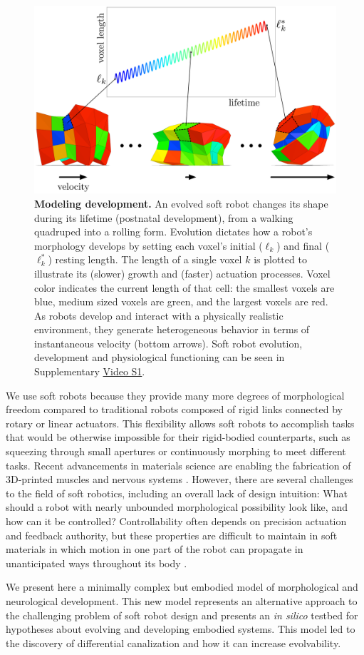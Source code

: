 \begin{figure}[t]
\centering
\includegraphics[width=0.8\linewidth]{Chapter04/Fig1}
\caption{\label{fig:blueprint}\textbf{Modeling development.} An evolved soft robot changes its shape during its lifetime (postnatal development), from a walking quadruped into a rolling form. 
Evolution dictates how a robot's morphology develops by setting each voxel's initial ($\ell_k$) and final ($\ell^*_k$) resting length.
The length of a single voxel $k$ is plotted to illustrate its (slower) growth and (faster) actuation processes.
Voxel color indicates the current length of that cell: the smallest voxels are blue, medium sized voxels are green, and the largest voxels are red.
As robots develop and interact with a physically realistic environment, they generate heterogeneous behavior in terms of instantaneous velocity (bottom arrows).
Soft robot evolution, development and physiological functioning can be seen in Supplementary \href{https://youtu.be/Ee2sU-AZWC4}{\color{blue}Video S1}.
}
\end{figure}


We use soft robots because they provide many more degrees of morphological freedom compared to traditional robots composed of rigid links connected by rotary or linear actuators.
This flexibility allows soft robots to accomplish tasks that would be otherwise impossible for their rigid-bodied counterparts, such as squeezing through small apertures \cite{Cheney:2015:ESR:2739480.2754662} or continuously morphing to meet different tasks.
Recent advancements in materials science are enabling the fabrication of 3D-printed muscles \cite{miriyev2017soft} and nervous systems \cite{wehner2016integrated}.
However, there are several challenges to the field of soft robotics, including an overall lack of design intuition:
What should a robot with nearly unbounded morphological possibility look like, and how can it be controlled?
Controllability often depends on precision actuation and feedback authority, but these properties are difficult to maintain in soft materials in which motion in one part of the robot can propagate in unanticipated ways throughout its body \cite{lipson2014challenges}.

We present here a minimally complex but embodied model of morphological and neurological development.
This new model represents an alternative approach to the challenging problem of soft robot design and presents an \textit{in silico} testbed for hypotheses about evolving and developing embodied systems.
This model led to the discovery of differential canalization and how it can increase evolvability.


